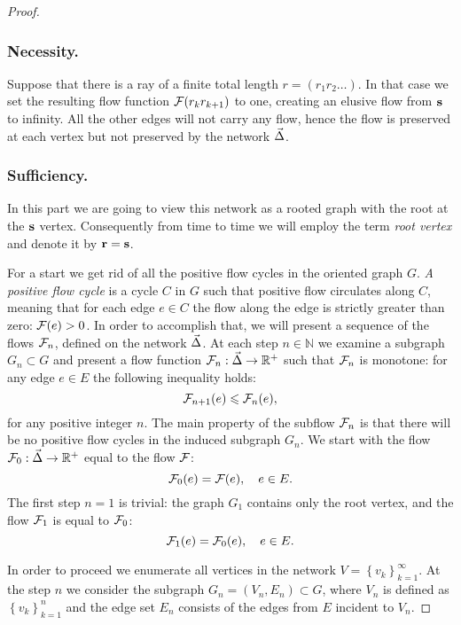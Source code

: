 \documentclass[12pt]{amsart}
\begin{document}
\begin{proof}
      \subsubsection*{Necessity.}
      Suppose that there is a ray of a finite total length $r=(r_1 r_2 \dots)$.
      In that case we set the resulting flow function $\mathcal{F}(r_k r_{k+1})$ to one, creating an elusive flow
        from $\mathbf{s}$ to infinity. All the other edges will not carry any flow, hence the flow is preserved
        at each vertex but not preserved by the network $\vec{\Delta}$.
      \subsubsection*{Sufficiency.}
      In this part we are going to view this network as a rooted graph with the root at the $\mathbf{s}$ vertex.
      Consequently from time to time we will employ the term \emph{root vertex} and denote it by $\mathbf{r} = \mathbf{s}$.

      For a start we get rid of all the positive flow cycles in the oriented graph $G$.
      \emph{A positive flow cycle} is a cycle $C$ in $G$ such that positive flow circulates along $C$,
        meaning that for each edge $e \in C$ the flow along the edge is strictly greater than zero: $\mathcal{F}(e) > 0$.
      In order to accomplish that, we will present a sequence of the flows $\mathcal{F}_{n}$, defined on the network $\vec{\Delta}$.
      At each step $n \in \mathbb{N}$ we examine a subgraph $G_n \subset G$ and present a flow function $\mathcal{F}_{n}: \vec{\Delta} \to \mathbb{R}^{+}$
        such that $\mathcal{F}_{n}$ is monotone: for any edge $e \in E$ the following inequality holds:
      \[
        \mathcal{F}_{n+1}(e) \leqslant \mathcal{F}_{n}(e),
      \]
      for any positive integer $n$.
      The main property of the subflow $\mathcal{F}_{n}$ is that there will be no positive flow cycles in the induced subgraph
      $G_n$.
      We start with the flow $\mathcal{F}_{0}:\vec{\Delta} \to \mathbb{R}^+$ equal to the flow $\mathcal{F}$:
      \[
        \mathcal{F}_{0}(e) = \mathcal{F}(e), \quad e \in E.
      \]
      The first step $n = 1$ is trivial: the graph $G_1$ contains only the root vertex, and
        the flow $\mathcal{F}_{1}$ is equal to $\mathcal{F}_{0}$:
      \[
        \mathcal{F}_{1}(e) = \mathcal{F}_{0}(e), \quad e \in E.
      \]

      In order to proceed we enumerate all vertices in the network $V = \left\{v_k\right\}_{k=1}^\infty$.
      At the step $n$ we consider the subgraph $G_n = (V_n, E_n) \subset G$, where $V_n$ is defined as $\left\{v_k\right\}_{k=1}^n$
        and the edge set $E_n$ consists of the edges from $E$ incident to $V_n$.


\end{proof}
\end{document}
